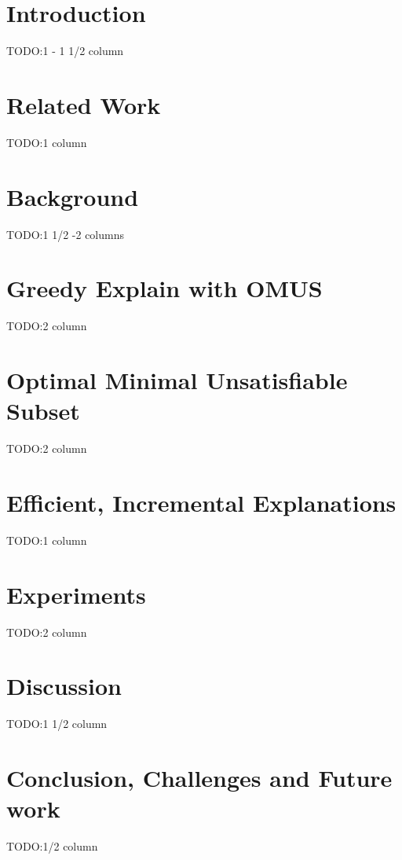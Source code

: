 \documentclass[letterpaper]{article} %
\newcommand\comment[1]{\marginpar{\tiny #1}}
\renewcommand\comment[1]{#1}
\newcommand{\todo}[1]{{\comment{\color{red}\textsc{TODO:}#1} }}
\begin{document}
\section{Introduction}
\todo{1 - 1 1/2 column}

\section{Related Work}
\todo{1 column}

\section{Background}
\todo{1 1/2 -2 columns}

\section{Greedy Explain with OMUS}
\todo{2 column}

\section{Optimal Minimal Unsatisfiable Subset}
\todo{2 column}

\section{Efficient, Incremental Explanations}
\todo{1 column}

\section{Experiments}
\todo{2 column}

\section{Discussion}
\todo{1 1/2 column}

\section{Conclusion, Challenges and Future work}
\todo{1/2 column}



\end{document}
